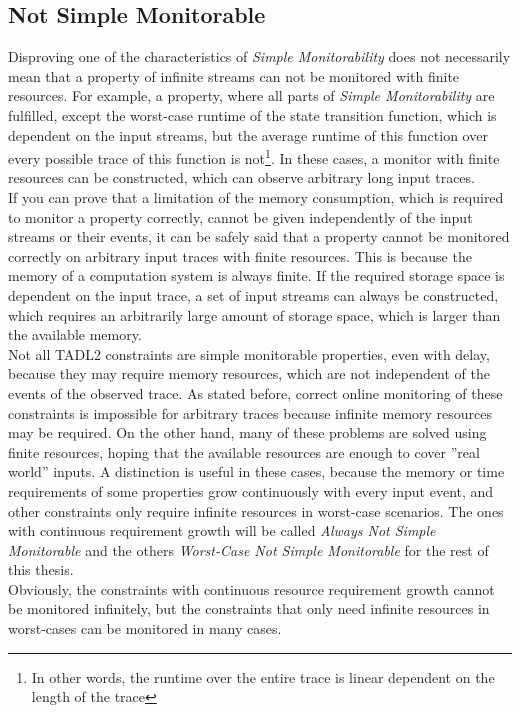 	\subsection{Not Simple Monitorable}
		Disproving one of the characteristics of \textit{Simple Monitorability} does not necessarily mean that a property of infinite streams can not be monitored with finite resources. For example, a property, where all parts of \textit{Simple Monitorability} are fulfilled, except the worst-case runtime of the state transition function, which is dependent on the input streams, but the average runtime of this function over every possible trace of this function is not\footnote{In other words, the runtime over the entire trace is linear dependent on the length of the trace}. In these cases, a monitor with finite resources can be constructed, which can observe arbitrary long input traces.\\
		If you can prove that a limitation of the memory consumption, which is required to monitor a property correctly, cannot be given independently of the input streams or their events, it can be safely said that a property cannot be monitored correctly on arbitrary input traces with finite resources. This is because the memory of a computation system is always finite. If the required storage space is dependent on the input trace, a set of input streams can always be constructed, which requires an arbitrarily large amount of storage space, which is larger than the available memory.\\
		Not all TADL2 constraints are simple monitorable properties, even with delay, because they may require memory resources, which are not independent of the events of the observed trace. As stated before, correct online monitoring of these constraints is impossible for arbitrary traces because infinite memory resources may be required. On the other hand, many of these problems are solved using finite resources, hoping that the available resources are enough to cover ''real world'' inputs.
		A distinction is useful in these cases, because the memory or time requirements of some properties grow continuously with every input event, and other constraints only require infinite resources in worst-case scenarios. 
		The ones with continuous requirement growth will be called \emph{Always Not Simple Monitorable} and the others \emph{Worst-Case Not Simple Monitorable} for the rest of this thesis.\\
		Obviously, the constraints with continuous resource requirement growth cannot be monitored infinitely, but the constraints that only need infinite resources in worst-cases can be monitored in many cases.

	 